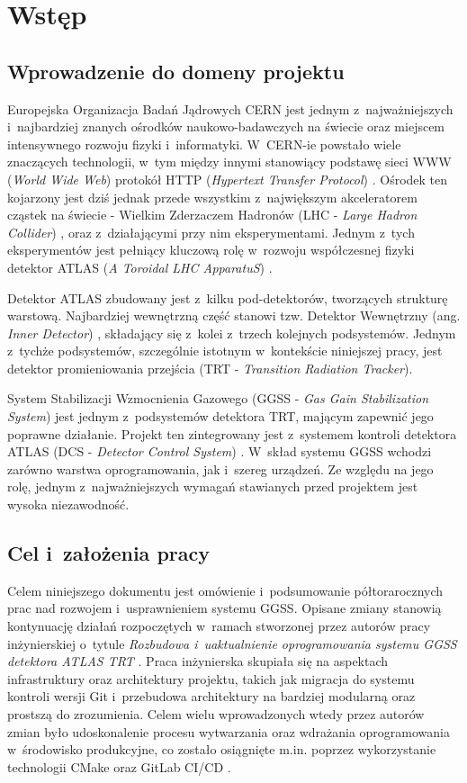 \chapter{Wstęp}
\label{cha:wstep}

\section{Wprowadzenie do domeny projektu}

Europejska Organizacja Badań Jądrowych CERN jest jednym z~najważniejszych i~najbardziej znanych ośrodków naukowo-badawczych na świecie oraz miejscem intensywnego rozwoju fizyki i~informatyki. W~CERN-ie powstało wiele znaczących technologii, w~tym między innymi stanowiący podstawę sieci WWW (\emph{World Wide Web}) \cite{WWW_wikipedia} protokół HTTP (\emph{Hypertext Transfer Protocol}) \cite{HTTP_wikipedia}. Ośrodek ten kojarzony jest dziś jednak przede wszystkim z~największym akceleratorem cząstek na świecie - Wielkim Zderzaczem Hadronów (LHC - \emph{Large Hadron Collider}) \cite{LHC_cern}, oraz z~działającymi przy nim eksperymentami. Jednym z~tych eksperymentów jest pełniący kluczową rolę w~rozwoju współczesnej fizyki detektor ATLAS (\emph{A Toroidal LHC ApparatuS}) \cite{ATLAS_cern}.

Detektor ATLAS zbudowany jest z~kilku pod-detektorów, tworzących strukturę warstową. Najbardziej wewnętrzną część stanowi tzw. Detektor Wewnętrzny (ang. \emph{Inner Detector}) \cite{ATLAS_agh}, składający się z~kolei z~trzech kolejnych podsystemów. Jednym z~tychże podsystemów, szczególnie istotnym w~kontekście niniejszej pracy, jest detektor promieniowania przejścia (TRT - \emph{Transition Radiation Tracker}).

System Stabilizacji Wzmocnienia Gazowego (GGSS - \emph{Gas Gain Stabilization System}) \cite{GGSS_jinst} jest jednym z~podsystemów detektora TRT, mającym zapewnić jego poprawne działanie. Projekt ten zintegrowany jest z~systemem kontroli detektora ATLAS (DCS - \emph{Detector Control System}) \cite{ATLAS_agh}. W~skład systemu GGSS wchodzi zarówno warstwa oprogramowania, jak i~szereg urządzeń. Ze względu na jego rolę, jednym z~najważniejszych wymagań stawianych przed projektem jest wysoka niezawodność.

\section{Cel i~założenia pracy}
Celem niniejszego dokumentu jest omówienie i~podsumowanie półtorarocznych prac nad rozwojem i~usprawnieniem systemu GGSS. Opisane zmiany stanowią kontynuację działań rozpoczętych w~ramach stworzonej przez autorów pracy inżynierskiej o~tytule \emph{Rozbudowa i~uaktualnienie oprogramowania systemu GGSS detektora ATLAS TRT} \cite{GGSS_inz}. Praca inżynierska skupiała się na aspektach infrastruktury oraz architektury projektu, takich jak migracja do systemu kontroli wersji Git \cite{Git_main} i~przebudowa architektury na bardziej modularną oraz prostszą do zrozumienia. Celem wielu wprowadzonych wtedy przez autorów zmian było udoskonalenie procesu wytwarzania oraz wdrażania oprogramowania w~środowisko produkcyjne, co zostało osiągnięte m.in. poprzez wykorzystanie technologii CMake \cite{CMake_main} oraz GitLab CI/CD \cite{CI_main}. 


